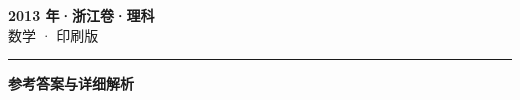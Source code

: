 \documentclass[zihao=5, a4paper]{ctexart}
\begin{document}
\begin{center}
  {\Large\bfseries 2013 年·浙江卷·理科}\\[4pt]
  {\large 数学 · 印刷版}
\end{center}
\medskip
{}

\par\bigskip\hrule\bigskip
{}
\Needspace{0.55\textheight}
\begin{center}{\large\bfseries 参考答案与详细解析}\end{center}
\smallskip

\end{document}
